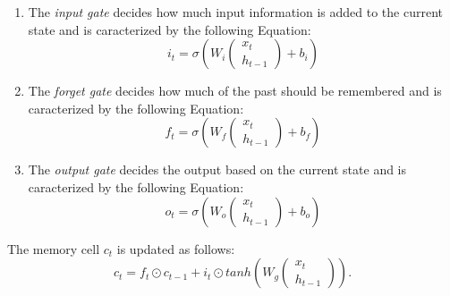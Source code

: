 \begin{enumerate}
    \item The \textit{input gate} decides how much input information is added to the current state and is caracterized by the following Equation:
        \begin{equation}
            i_t = \sigma \left(
                W_i
                \begin{pmatrix}
                x_t \\
                h_{t-1}
                \end{pmatrix}
                + b_i
            \right)
        \end{equation}
    
    \item The \textit{forget gate} decides how much of the past should be remembered and is caracterized by the following Equation:
        \begin{equation}
            f_t = \sigma \left(
                W_f
                \begin{pmatrix}
                x_t \\
                h_{t-1}
                \end{pmatrix}
                + b_f
            \right)
        \end{equation}

    \item The \textit{output gate} decides the output based on the current state and is caracterized by the following Equation:
        \begin{equation}
            o_t = \sigma \left(
                W_o
                \begin{pmatrix}
                x_t \\
                h_{t-1}
                \end{pmatrix}
                + b_o
            \right)
        \end{equation}

\end{enumerate}


The memory cell $c_t$ is updated as follows:
\begin{equation}
    c_t = f_t \odot c_{t-1} + i_t \odot tanh \left( W_g
        \begin{pmatrix}
            x_t \\
            h_{t-1}
        \end{pmatrix}
        \right) .
\end{equation}

